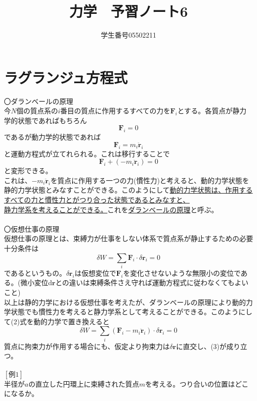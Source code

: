 \documentclass{jsarticle}
\title{力学　予習ノート6}
\author{学生番号05502211}
\date{}
\begin{document}
\maketitle
\section{ラグランジュ方程式}
\noindent
〇ダランベールの原理\\
今\(N\)個の質点系の\(i\)番目の質点に作用するすべての力を\(\bm{F}_{i}\)とする。各質点が静力学的状態であればもちろん
\[\bm{F}_{i}=0\]
であるが動力学的状態であれば
\[\bm{F}_{i}=m_{i}\ddot{\bm{r}}_{i}\]
と運動方程式が立てれられる。これは移行することで
\begin{equation}
\bm{F}_{i}+(-m_{i}\ddot{\bm{r}}_{i})=0
\end{equation}
と変形できる。\\
これは、\(-m_{i}\ddot{\bm{r}}_{i}\)を質点に作用する一つの力(慣性力)と考えると、動的力学状態を静的力学状態とみなすことができる。このようにして\underline{動的力学状態は、作用するすべての力と慣性力とがつり合った状態であるとみなすと、}\\
\underline{静力学系を考えることができる。}これを\underline{ダランベールの原理}と呼ぶ。\\
\\
〇仮想仕事の原理\\
仮想仕事の原理とは、束縛力が仕事をしない体系で質点系が静止するための必要十分条件は
\begin{equation}
\delta W=\sum_{i}\bm{F}_{i}\cdot\delta\bm{r}_{i}=0
\end{equation}
であるというもの。\(\delta\bm{r}_{i}\)は仮想変位で\(\bm{F}_{i}\)を変化させないような無限小の変位である。(微小変位d\(\bm{r}\)との違いは束縛条件さえ守れば運動方程式に従わなくてもよいこと)\\
以上は静的力学における仮想仕事を考えたが、ダランベールの原理により動的力学状態でも慣性力を考えると静力学系として考えることができる。このようにして(2)式を動的力学で置き換えると
\begin{equation}
\delta W=\sum_{i}(\bm{F}_{i}-m_{i}\ddot{\bm{r}}_{i})\cdot\delta\bm{r}_{i}=0
\end{equation}
質点に拘束力が作用する場合にも、仮定より拘束力は\(\delta\bm{r}\)に直交し、(3)が成り立つ。\\
\\
\([例1]\)\\
半径が\(a\)の直立した円環上に束縛された質点\(m\)を考える。つり合いの位置はどこになるか。\\
\\
\end{document}
